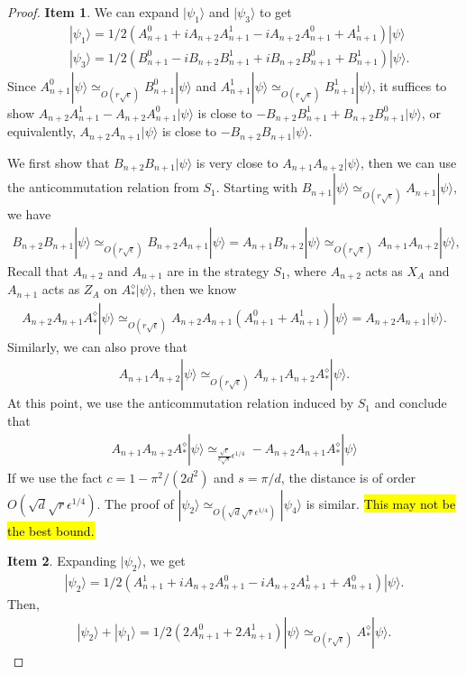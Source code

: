 \documentclass[11pt,letterpaper]{article}
\newcommand{\ket}[1]{|#1\rangle}
\newcommand{\1}{\mathbb{1}}
\newcommand{\se}{\sqrt{\epsilon}}
\newcommand{\qe}{\epsilon^{1/4}}
\newcommand{\sd}{\sqrt{d}}
\newcommand{\sr}{\sqrt{r}}
\newcommand{\appd}[1]{\simeq_{#1}}
\theoremstyle{definition}
\begin{document}
\begin{proof}
	\textbf{Item 1}. We can expand $\ket{\psi_1}$ and $\ket{\psi_3}$ to get
	\begin{align}
		&\ket{\psi_1} = 1/2(A_{n+1}^0 + iA_{n+2}A_{n+1}^1 - iA_{n+2}A_{n+1}^0 +A_{n+1}^1) \ket{\psi} \\
		&\ket{\psi_3} = 1/2(B_{n+1}^0 - iB_{n+2}B_{n+1}^1+iB_{n+2}B_{n+1}^0 + B_{n+1}^1)\ket{\psi}.
	\end{align}
	Since $A_{n+1}^0 \ket{\psi} \appd{O(r\se)} B_{n+1}^0 \ket{\psi}$ and $A_{n+1}^1 \ket{\psi} \appd{O(r\se)} B_{n+1}^1 \ket{\psi}$,
	it suffices to show
	$A_{n+2}A_{n+1}^1 - A_{n+2}A_{n+1}^0 \ket{\psi}$ is close to $- B_{n+2}B_{n+1}^1+B_{n+2}B_{n+1}^0\ket{\psi}$,
	or equivalently,
	$A_{n+2}A_{n+1} \ket{\psi}$ is close to $-B_{n+2}B_{n+1} \ket{\psi}$.

	
	We first show that $B_{n+2}B_{n+1} \ket{\psi}$ is very close to $A_{n+1}A_{n+2}\ket{\psi}$, then we 
	can use the anticommutation relation from $S_1$.
	Starting with $B_{n+1} \ket{\psi} \appd{O(r\se)} A_{n+1}\ket{\psi}$, we have
	\begin{align}
		B_{n+2}B_{n+1}\ket{\psi} \appd{O(r\se)} B_{n+2}A_{n+1}\ket{\psi} =A_{n+1} B_{n+2}\ket{\psi} \appd{O(r\se)} A_{n+1}A_{n+2}\ket{\psi},
	\end{align}
	Recall that $A_{n+2}$ and $A_{n+1}$ are in the strategy $S_1$, where $A_{n+2}$ acts as $X_A$ 
	and $A_{n+1}$ acts as $Z_A$ on $A_\ast^\diamond \ket{\psi}$, then we know 
	\begin{align}
		A_{n+2}A_{n+1} A_\ast^\diamond \ket{\psi} \appd{O(r\se)} A_{n+2}A_{n+1}(A_{n+1}^0 + A_{n+1}^1)\ket{\psi} = A_{n+2}A_{n+1}\ket{\psi}.
	\end{align}
	Similarly, we can also prove that 
	\begin{align}
		A_{n+1}A_{n+2} \ket{\psi} \appd{O( r\se)} A_{n+1}A_{n+2} A_\ast^\diamond \ket{\psi}.
	\end{align}
	At this point, we use the anticommutation relation induced by $S_1$ and conclude that 
	\begin{align}
		A_{n+1}A_{n+2} A_\ast^\diamond \ket{\psi} \appd{\frac{\sqrt{r}}{c\sqrt{s}}\qe} -A_{n+2}A_{n+1} A_\ast^\diamond \ket{\psi}
	\end{align}
	If we use the fact $c = 1 - \pi^2/(2d^2)$ and $s = \pi/d$, the distance is of order $O(\sd \sr \qe)$.
	The proof of $\ket{\psi_2} \appd{O(\sd \sr \qe)} \ket{\psi_4}$ is similar.
	\hl{This may not be the best bound.}
	
	\textbf{Item 2}. Expanding $\ket{\psi_2}$, we get
	\begin{align}
		\ket{\psi_2} = 1/2(A_{n+1}^1 + iA_{n+2}A_{n+1}^0 -iA_{n+2}A_{n+1}^1 + A_{n+1}^0)\ket{\psi}.
	\end{align}
	Then,
	\begin{align}
		\ket{\psi_2} + \ket{\psi_1} = 1/2( 2A_{n+1}^0 + 2A_{n+1}^1) \ket{\psi} \appd{O(r\se)} A_\ast^\diamond \ket{\psi}.
	\end{align}
	

\end{proof}
\end{document}
